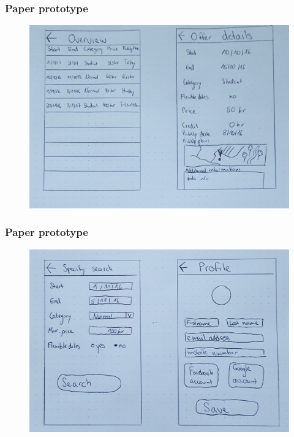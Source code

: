 \documentclass{beamer}
\begin{document}

\begin{frame}
\frametitle{Paper prototype}
\begin{figure}
\includegraphics[width=0.8\linewidth]{jpg/paper-prototype-2-a}
\end{figure}
\end{frame}


\begin{frame}
\frametitle{Paper prototype}
\begin{figure}
\includegraphics[width=0.8\linewidth]{jpg/paper-prototype-2-b}
\end{figure}
\end{frame}

\end{document}
